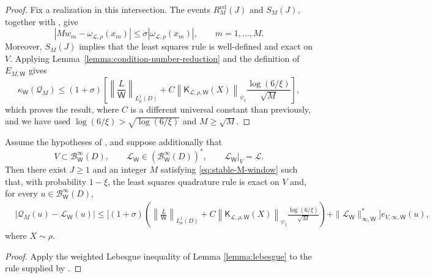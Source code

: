 \documentclass[10pt,dvipsnames]{amsart}
\begin{document}
\begin{proof}
Fix a realization in this intersection. The events
\(R_M^{\mathrm{rel}}(J)\) and \(S_M(J)\), together with
, give
\[
    \left|
        Mw_m-\omega_{\mathcal L,\rho}(x_m)
    \right|
    \leq
    \sigma
    |\omega_{\mathcal L,\rho}(x_m)|,
    \qquad
    m=1,\ldots,M.
\]
Moreover, \(S_M(J)\) implies that the least squares rule is well-defined and
exact on \(V\). Applying Lemma~\ref{lemma:condition-number-reduction} and the
definition of \(E_{M,\mathsf W}\) gives
\[
    \kappa_{\mathsf W}(\mathcal Q_M)
    \leq
    (1+\sigma)
    \left[
        \left\|
            \frac{L}{\mathsf W}
        \right\|_{L^1_\mu(D)}
        +
        C
        \left\|
            \mathsf K_{\mathcal L,\rho,\mathsf W}(X)
        \right\|_{\psi_1}
        \frac{\log(6/\xi)}{\sqrt{M}}
    \right],
\]
which proves the result, where $C$ is a different universal constant than previously, and we have used $\log(6/\xi) > \sqrt{\log(6/\xi)}$ and $M \geq \sqrt{M}$.
\end{proof}

\begin{corollary}
\label{cor:stable-intermediate-approximation}

Assume the hypotheses of
, and suppose additionally that 
\[
    V \subset \mathcal{B}^\infty_{\mathsf W}(D), \qquad
    \mathcal L_{\mathsf W}\in (\mathcal{B}^\infty_{\mathsf W}(D))^*,
    \qquad
    \mathcal L_{\mathsf W}|_V=\mathcal L.
\]Then there exist \(J\geq1\) and an integer
\(M\) satisfying \eqref{eq:stable-M-window} such that, with
probability $1-\xi$, the least squares quadrature rule is exact on \(V\) and, for
every \(u\in \mathcal{B}^\infty_{\mathsf W}(D)\),
\begin{align*}
    &|\mathcal Q_M(u)-\mathcal L_{\mathsf W}(u)|
    \leq 
    \Bigg[
        (1+\sigma)
        \left(
            \left\|
                \frac{L}{\mathsf W}
            \right\|_{L^1_\mu(D)}
           + 
            C
            \left\|
                \mathsf K_{\mathcal L,\rho,\mathsf W}(X)
            \right\|_{\psi_1}
            \frac{\log(6/\xi)}{\sqrt{M}}
        \right)
        +
        \|\mathcal L_{\mathsf W}\|_{\infty,\mathsf W}^*
    \Bigg]
    e_{V,\infty,\mathsf W}(u),
\end{align*}
where \(X\sim\rho\).
\end{corollary}
\begin{proof}
Apply the weighted Lebesgue inequality of
Lemma \ref{lemma:lebesgue} to the rule supplied by
.
\end{proof}
\end{document}
